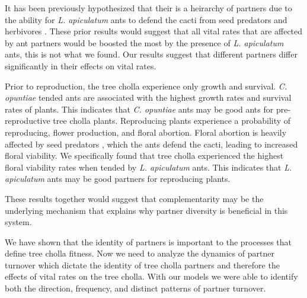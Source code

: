 \documentclass[11pt]{article}
\begin{document}
It has been previously hypothesized that their is a heirarchy of partners due to the ability for \textit{L. apiculatum} ants to defend the cacti from seed predators and herbivores \cite{Miller2007}.
These prior results would suggest that all vital rates that are affected by ant partners would be boosted the most by the presence of \textit{L. apiculatum} ants, this is not what we found. 
Our results suggest that different partners differ significantly in their effects on vital rates.

Prior to reproduction, the tree cholla experience only growth and survival.
\textit{C. opuntiae} tended ants are associated with the highest growth rates and survival rates of plants. 
This indicates that \textit{C. opuntiae} ants may be good ants for pre-reproductive tree cholla plants. 
Reproducing plants experience a probability of reproducing, flower production, and floral abortion.
Floral abortion is heavily affected by seed predators \cite{Miller2008}, which the ants defend the cacti, leading to increased floral viability.
We specifically found that tree cholla experienced the highest floral viability rates when tended by \textit{L. apiculatum} ants. 
This indicates that \textit{L. apiculatum} ants may be good partners for reproducing plants. 

These results together would suggest that complementarity may be the underlying mechanism that explains why partner diversity is beneficial in this system. 


We have shown that the identity of partners is important to the processes that define tree cholla fitness. 
Now we need to analyze the dynamics of partner turnover which dictate the identity of tree cholla partners and therefore the effects of vital rates on the tree cholla. 
With our models we were able to identify both the direction, frequency, and distinct patterns of partner turnover. 
\end{document}

